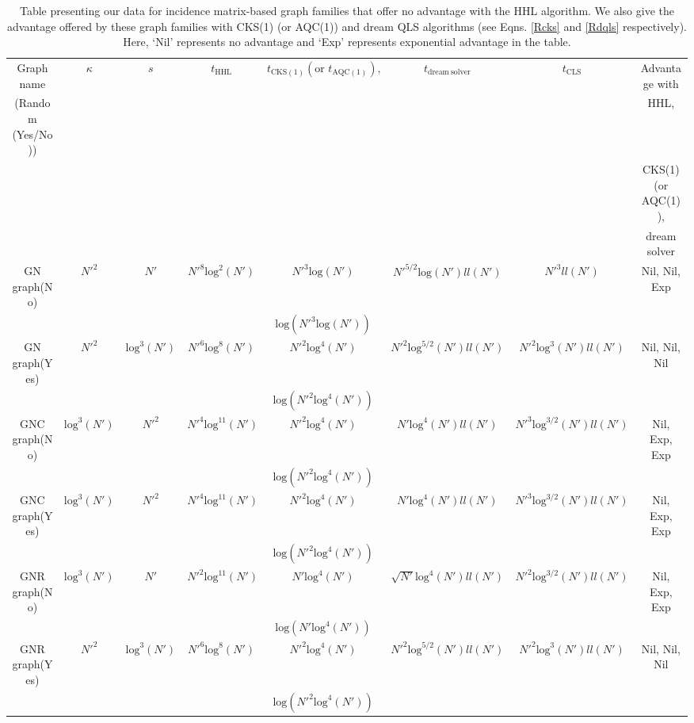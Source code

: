 \documentclass[%
 reprint,
 superscriptaddress,
 amsmath,amssymb,
 aps,
 pra,
floatfix,
nofootinbib,
]{revtex4-2}
\theoremstyle{definition}
\theoremstyle{remark}
\begin{document}
\newcommand{\colm}[8]{#1 &#2 &#3 &#4 &#5  &#6 &#7 &#8  \\ }
\begin{table}[t] 
\caption{Table presenting our data for incidence matrix-based graph families that offer no advantage with the HHL algorithm. We also give the advantage offered by these graph families with CKS(1) (or AQC(1)) and dream QLS algorithms (see Eqns. \ref{Rcks} and \ref{Rdqls} respectively). Here,  `Nil' represents no advantage and `Exp' represents exponential advantage in the table. } 
\label{tab:incidence2} 
\centering 
\hspace*{-1.3cm}
\begin{tabular}{|c|c|c|c|c|c|c|c|}

\hline 
\colm{Graph name}{$\kappa$}{$s$}{$t_{\mathrm{HHL}}$}
{$t_{\mathrm{CKS(1)}}(\text{or }t_{\mathrm{AQC(1)}}), $}
{$t_{\mathrm{dream\ solver}}$}
{$t_{\mathrm{CLS}}$}{Advantage with} 
\colm{(Random (Yes/No))}{}{}{}{}{}{}{HHL, }
\colm{}{}{}{}{}{}{}{CKS(1)(or AQC(1)),}
\colm{}{}{}{}{}{}{}{dream solver}

\hline 
\hline 

\colm{GN graph(No)}{$N'^2$}{$N'$} {$N'^8\mathrm{log}^{2}(N')$}{$N'^3\mathrm{log}(N')$}{$N'^{5/2}\mathrm{log}(N')ll(N')$}{$N'^3  ll(N')$}{Nil, Nil, Exp}
\colm{}{}{}{}{$\mathrm{log}(N'^3\mathrm{log}(N'))$}{}{}{}
\hline 

\colm{GN graph(Yes)}{$N'^2$}{$\mathrm{log}^3(N')$} {$N'^6\mathrm{log}^{8}(N')$}{$N'^2\mathrm{log}^4(N')$}{$N'^{2}\mathrm{log}^{5/2}(N')ll(N')$}{$N'^2 \mathrm{log}^3(N') ll(N')$}{Nil, Nil, Nil}
\colm{}{}{}{}{$\mathrm{log}(N'^2\mathrm{log}^4(N'))$}{}{}{}
\hline 

\colm{GNC graph(No)}{$\mathrm{log}^3(N')$} {$N'^2$} {$N'^4\mathrm{log}^{11}(N')$}{$N'^2\mathrm{log}^4(N')$}{$N'\mathrm{log}^{4}(N')ll(N')$}{$N'^3 \mathrm{log}^{3/2}(N') ll(N')$}{Nil, Exp, Exp}
\colm{}{}{}{}{$\mathrm{log}(N'^2\mathrm{log}^4(N'))$}{}{}{}
\hline

\colm{GNC graph(Yes)}{$\mathrm{log}^3(N')$} {$N'^2$} {$N'^4\mathrm{log}^{11}(N')$}{$N'^2\mathrm{log}^4(N')$}{$N'\mathrm{log}^{4}(N')ll(N')$}{$N'^3 \mathrm{log}^{3/2}(N') ll(N')$}{Nil, Exp, Exp}
\colm{}{}{}{}{$\mathrm{log}(N'^2\mathrm{log}^4(N'))$}{}{}{}
\hline

\colm{GNR graph(No)}{$\mathrm{log}^3(N')$} {$N'$} {$N'^2\mathrm{log}^{11}(N')$}{$N'\mathrm{log}^4(N')$}{$\sqrt{N'}\mathrm{log}^{4}(N')ll(N')$}{$N'^2 \mathrm{log}^{3/2}(N') ll(N')$}{Nil, Exp, Exp}
\colm{}{}{}{}{$\mathrm{log}(N'\mathrm{log}^4(N'))$}{}{}{}
\hline

\colm{GNR graph(Yes)}{$N'^2$} {$\mathrm{log}^3(N')$} {$N'^6\mathrm{log}^{8}(N')$}{$N'^2\mathrm{log}^4(N')$}{$N'^2\mathrm{log}^{5/2}(N')ll(N')$}{$N'^2 \mathrm{log}^{3}(N') ll(N')$}{Nil, Nil, Nil}
\colm{}{}{}{}{$\mathrm{log}(N'^2\mathrm{log}^4(N'))$}{}{}{}
\hline

\hline \hline 
\end{tabular} 
\end{table} 
\end{document}
